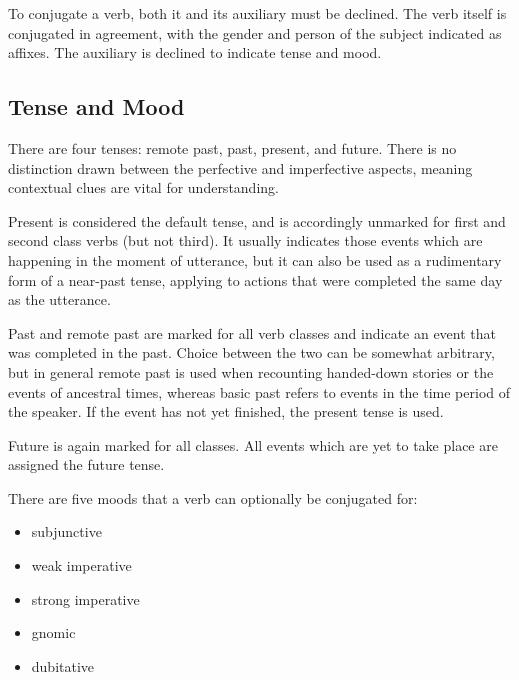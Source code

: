 To conjugate a verb, both it and its auxiliary must be declined. The verb itself
is conjugated in agreement, with the gender and person of the subject indicated
as affixes. The auxiliary is declined to indicate tense and mood.

\subsection{Tense and Mood}

There are four tenses: remote past, past, present, and future. There is no
distinction drawn between the perfective and imperfective aspects, meaning
contextual clues are vital for understanding.

Present is considered the default tense, and is accordingly unmarked for first
and second class verbs (but not third). It usually indicates those events which
are happening in the moment of utterance, but it can also be used as a
rudimentary form of a near-past tense, applying to actions that were completed
the same day as the utterance.

Past and remote past are marked for all verb classes and indicate an event that
was completed in the past. Choice between the two can be somewhat arbitrary, but
in general remote past is used when recounting handed-down stories or the events
of ancestral times, whereas basic past refers to events in the time period of
the speaker. If the event has not yet finished, the present tense is used.

Future is again marked for all classes. All events which are yet to take place
are assigned the future tense.

There are five moods that a verb can optionally be conjugated for:

\begin{itemize}
\item subjunctive
\item weak imperative
\item strong imperative
\item gnomic
\item dubitative
\end{itemize}

